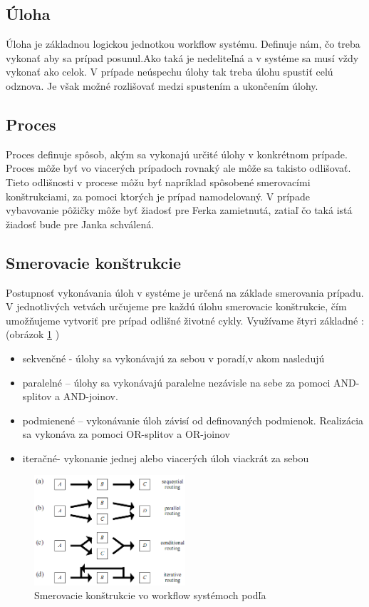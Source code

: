 \subsection{Úloha}
Úloha je základnou logickou jednotkou workflow systému. Definuje nám, čo treba vykonať aby sa prípad posunul.Ako taká je nedeliteľná a v systéme sa musí vždy vykonať ako celok. V prípade neúspechu úlohy tak treba úlohu spustiť celú odznova. Je však možné rozlišovať medzi spustením a ukončením úlohy. 

\subsection{Proces}
Proces definuje spôsob, akým sa vykonajú určité úlohy v konkrétnom prípade. Proces môže byť vo viacerých prípadoch rovnaký  ale môže sa takisto odlišovať. Tieto odlišnosti v procese môžu byť napríklad spôsobené smerovacími konštrukciami, za pomoci ktorých je prípad namodelovaný. V prípade vybavovanie pôžičky môže byť žiadosť pre Ferka zamietnutá, zatiaľ čo taká istá žiadosť bude pre Janka schválená.

\subsection{Smerovacie konštrukcie}
	Postupnosť vykonávania  úloh v systéme je určená na základe smerovania prípadu. V jednotlivých vetvách určujeme pre každú úlohu smerovacie konštrukcie, čím umožňujeme vytvoriť  pre prípad odlišné životné cykly. Využívame štyri základné :  (obrázok \ref{obr:smerovacie_konstrukcie_WfMS} )
\begin{itemize}
	\item sekvenčné - úlohy sa vykonávajú za sebou v poradí,v akom nasledujú
	\item paralelné – úlohy sa vykonávajú paralelne nezávisle na sebe za pomoci AND-splitov a AND-joinov.
	\item podmienené – vykonávanie úloh závisí od definovaných podmienok. Realizácia sa vykonáva za pomoci OR-splitov a OR-joinov
	\item iteračné- vykonanie jednej alebo viacerých úloh viackrát za sebou
\end{itemize}

\begin{figure}[H]
	\centerline{\includegraphics[width=0.5\textwidth]{images/smerovacie_konstrukcie}}
	\caption[smerovacie konštrukcie]{Smerovacie konštrukcie vo workflow systémoch podľa \cite{workflow_systemy}}
	\label{obr:smerovacie_konstrukcie_WfMS}
\end{figure}

